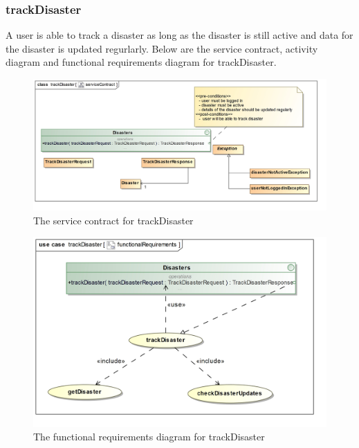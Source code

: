 \subsubsection{trackDisaster}

A user is able to track a disaster as long as the disaster is still active and data for the disaster is updated regurlarly. Below are the service contract, activity diagram and functional requirements diagram for trackDisaster.

\begin{figure}[H]
	\centering
	\includegraphics[width=1.0\textwidth]{../images/funcReq/trackDisasterServiceContract.jpg}
	\caption{The service contract for trackDisaster \label{overflow}}
\end{figure}

\begin{figure}[H]
	\centering
	\includegraphics[width=1.0\textwidth]{../images/funcReq/trackDisasterFunctionalRequirements.jpg}
	\caption{The functional requirements diagram for trackDisaster \label{overflow}}
\end{figure}

